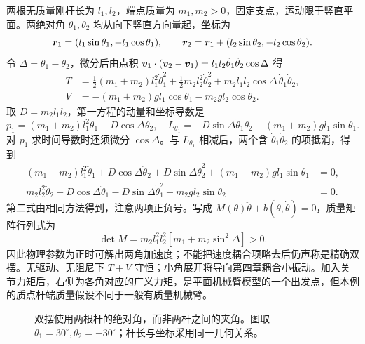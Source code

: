\begin{example}[双摆：把耦合项逐项算出来]
两根无质量刚杆长为 $l_1,l_2$，端点质量为 $m_1,m_2>0$，固定支点，运动限于竖直平面。两绝对角 $\theta_1,\theta_2$ 均从向下竖直方向量起，坐标为
\[
\boldsymbol{r}_1=(l_1\sin\theta_1,-l_1\cos\theta_1),\qquad
\boldsymbol{r}_2=\boldsymbol{r}_1+(l_2\sin\theta_2,-l_2\cos\theta_2).
\]
令 $\Delta=\theta_1-\theta_2$，微分后由点积 $\boldsymbol{v}_1\cdot(\boldsymbol{v}_2-\boldsymbol{v}_1)=l_1l_2\dot\theta_1\dot\theta_2\cos\Delta$ 得
\begin{align}
T&=\tfrac12(m_1+m_2)l_1^2\dot\theta_1^2+\tfrac12m_2l_2^2\dot\theta_2^2
+m_2l_1l_2\cos\Delta\,\dot\theta_1\dot\theta_2,\\
V&=-(m_1+m_2)gl_1\cos\theta_1-m_2gl_2\cos\theta_2.
\end{align}
取 $D=m_2l_1l_2$，第一方程的动量和坐标导数是
\[
p_1=(m_1+m_2)l_1^2\dot\theta_1+D\cos\Delta\dot\theta_2,
\quad L_{\theta_1}=-D\sin\Delta\dot\theta_1\dot\theta_2-(m_1+m_2)gl_1\sin\theta_1.
\]
对 $p_1$ 求时间导数时还须微分 $\cos\Delta$。与 $L_{\theta_1}$ 相减后，两个含 $\dot\theta_1\dot\theta_2$ 的项抵消，得到
\begin{align}\label{eq:lag-double-pendulum}
(m_1+m_2)l_1^2\ddot\theta_1+D\cos\Delta\ddot\theta_2
+D\sin\Delta\dot\theta_2^2+(m_1+m_2)gl_1\sin\theta_1&=0,\nonumber\\
m_2l_2^2\ddot\theta_2+D\cos\Delta\ddot\theta_1
-D\sin\Delta\dot\theta_1^2+m_2gl_2\sin\theta_2&=0.
\end{align}
第二式由相同方法得到，注意两项正负号。写成 $M(\theta)\ddot\theta+b(\theta,\dot\theta)=0$，质量矩阵行列式为
\[
\det M=m_2l_1^2l_2^2[m_1+m_2\sin^2\Delta]>0.
\]
因此物理参数为正时可解出两角加速度；不能把速度耦合项略去后仍声称是精确双摆。无驱动、无阻尼下 $T+V$ 守恒；小角展开将导向第四章耦合小振动。加入关节力矩后，右侧为各角对应的广义力矩，是平面机械臂模型的一个出发点，但本例的质点杆端质量假设不同于一般有质量机械臂。
\end{example}
\begin{figure}[htbp]
\centering
{}
\caption{双摆使用两根杆的绝对角，而非两杆之间的夹角。图取 $\theta_1=30^\circ,\theta_2=-30^\circ$；杆长与坐标采用同一几何关系。}
\label{fig:lag-double-pendulum}
\end{figure}

